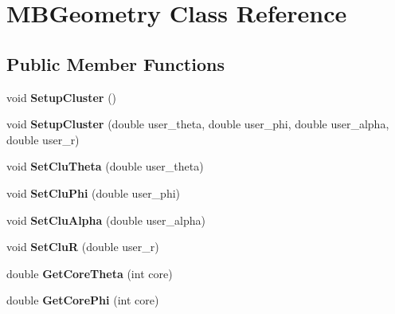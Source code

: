 \hypertarget{class_m_b_geometry}{}\section{M\+B\+Geometry Class Reference}
\label{class_m_b_geometry}
\subsection*{Public Member Functions}
\begin{DoxyCompactItemize}
\item 
\mbox{\label{class_m_b_geometry_a4d98a38f0dc1ca6a4a73477dde5cdd8d}} 
void {\bfseries Setup\+Cluster} ()
\item 
\mbox{\label{class_m_b_geometry_a93f157cebad3f63dbbefb5b08f3555af}} 
void {\bfseries Setup\+Cluster} (double user\+\_\+theta, double user\+\_\+phi, double user\+\_\+alpha, double user\+\_\+r)
\item 
\mbox{\label{class_m_b_geometry_a9a2a8c9609141be92d7ba30e6087aa30}} 
void {\bfseries Set\+Clu\+Theta} (double user\+\_\+theta)
\item 
\mbox{\label{class_m_b_geometry_a74142f84cf6317d52ae39c0e0ff8a87e}} 
void {\bfseries Set\+Clu\+Phi} (double user\+\_\+phi)
\item 
\mbox{\label{class_m_b_geometry_a0d4868b0360a6e5534918a9813540015}} 
void {\bfseries Set\+Clu\+Alpha} (double user\+\_\+alpha)
\item 
\mbox{\label{class_m_b_geometry_a292c4326421c78871667e91c3694ae35}} 
void {\bfseries Set\+CluR} (double user\+\_\+r)
\item 
\mbox{\label{class_m_b_geometry_a42aa536f15017724812712b0f8a77c12}} 
double {\bfseries Get\+Core\+Theta} (int core)
\item 
\mbox{\label{class_m_b_geometry_a39f685610ae0e68e547a46f8ef992599}} 
double {\bfseries Get\+Core\+Phi} (int core)
\item 
\mbox{\label{class_m_b_geometry_a49cdf742a2902fc85f0b24dfffa554a8}} 

\end{DoxyCompactItemize}
